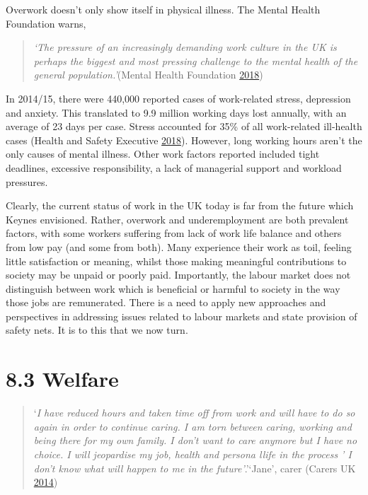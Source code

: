 \documentclass[]{tufte-handout}
\begin{document}
Overwork doesn't only show itself in physical illness. The Mental Health
Foundation warns,

\begin{quote}
\emph{`The pressure of an increasingly demanding work culture in the UK
is perhaps the biggest and most pressing challenge to the mental health
of the general population.'}(Mental Health Foundation
\protect\hyperlink{ref-MentalHealthFoundation2018}{2018})
\end{quote}

In 2014/15, there were 440,000 reported cases of work-related stress,
depression and anxiety. This translated to 9.9 million working days lost
annually, with an average of 23 days per case. Stress accounted for 35\%
of all work-related ill-health cases (Health and Safety Executive
\protect\hyperlink{ref-HealthandSafetyExecutive2018}{2018}). However,
long working hours aren't the only causes of mental illness. Other work
factors reported included tight deadlines, excessive responsibility, a
lack of managerial support and workload pressures.

Clearly, the current status of work in the UK today is far from the
future which Keynes envisioned. Rather, overwork and underemployment are
both prevalent factors, with some workers suffering from lack of work
life balance and others from low pay (and some from both). Many
experience their work as toil, feeling little satisfaction or meaning,
whilst those making meaningful contributions to society may be unpaid or
poorly paid. Importantly, the labour market does not distinguish between
work which is beneficial or harmful to society in the way those jobs are
remunerated. There is a need to apply new approaches and perspectives in
addressing issues related to labour markets and state provision of
safety nets. It is to this that we now turn.

\hypertarget{welfare}{%
\section{8.3 Welfare}\label{welfare}}

\begin{quote}
`\emph{I have reduced hours and taken time off from work and will have
to do so again in order to continue caring. I am torn between caring,
working and being there for my own family. I don't want to care anymore
but I have no choice. I will jeopardise my job, health and persona llife
in the process ' I don't know what will happen to me in the
future'}.'`Jane', carer (Carers UK
\protect\hyperlink{ref-CarersUK2014}{2014})
\end{quote}
\end{document}
